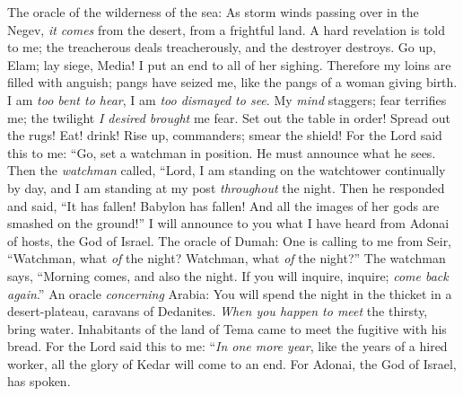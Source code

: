 \begin{biblechapter} %
 The oracle of the wilderness of the sea: As storm winds passing over in the Negev, \textit{it comes} from the desert, 
from a frightful land.
\verse A hard revelation is told to me; the treacherous deals treacherously, 
and the destroyer destroys. 
Go up, Elam; 
lay siege, Media! I put an end to all of her sighing.
\verse Therefore my loins are filled with anguish; 
pangs have seized me, like the pangs of a woman giving birth. 
I am \textit{too bent to hear}, 
I am \textit{too dismayed to see}.
\verse My \textit{mind} staggers; fear terrifies me; 
the twilight \textit{I desired} \textit{brought} me fear.
\verse Set out the table in order! 
Spread out the rugs! 
Eat! drink! 
Rise up, commanders; 
smear the shield!
\verse For the Lord said this to me:
\verse “Go, set a watchman in position. 
He must announce what he sees.
\verse Then the \textit{watchman} called,
\verse “Lord, I am standing on the watchtower continually by day, 
and I am standing at my post \textit{throughout} the night. Then he responded and said,
\verse “It has fallen! Babylon has fallen! 
And all the images of her gods are smashed on the ground!” I will announce to you what I have heard from Adonai of hosts, the God of Israel.
 The oracle of Dumah: One is calling to me from Seir, “Watchman, what \textit{of} the night? 
Watchman, what \textit{of} the night?”
\verse The watchman says, “Morning comes, 
and also the night. 
If you will inquire, inquire; 
\textit{come back again}.”
 An oracle \textit{concerning} Arabia:
\verse You will spend the night in the thicket in a desert-plateau, 
caravans of Dedanites.
\verse \textit{When you happen to meet} the thirsty, bring water. 
Inhabitants of the land of Tema came to meet the fugitive with his bread.
\verse For the Lord said this to me: “\textit{In one more year}, like the years of a hired worker,
\verse all the glory of Kedar will come to an end. For Adonai, the God of Israel, has spoken.
\end{biblechapter}

